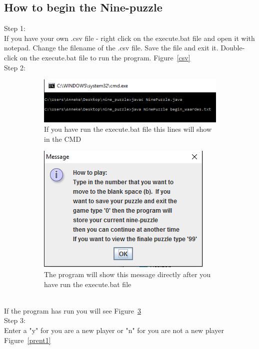 \documentclass[10pt]{article}
\begin{document}
\subsection{How to begin the Nine-puzzle}
Step 1:
\\If you have your own .csv file - right click on the execute.bat file and open it with notepad.
Change the filename of the .csv file.  Save the file and exit it.  Double-click on the execute.bat file to run the program. Figure~\ref{csv}
\\Step 2:
\begin{figure}[b!]
    \centering
    \begin{subfigure}[b]{0.5\textwidth}
        \centering
        \includegraphics[scale=0.8]{./Prente/begincmd.png}
        \caption{If you have run the execute.bat file this lines will show in the CMD }
        \label{begincmd}
    \end{subfigure}%
 
    \begin{subfigure}[b]{0.5\textwidth}
        \centering
        \includegraphics[scale=0.8]{./Prente/MessageBegin.png}
        \caption{The program will show this message directly after you have run the execute.bat file}
        \label{MessageBegin}
    \end{subfigure}
    \caption{\label{1}}
   \end{figure}
\\If the program has run you will see Figure~\ref{1}
\\Step 3: 
\\Enter a "y" for you are a new player or "n" for you are not a new player Figure~\ref{prent1}
\end{document}
